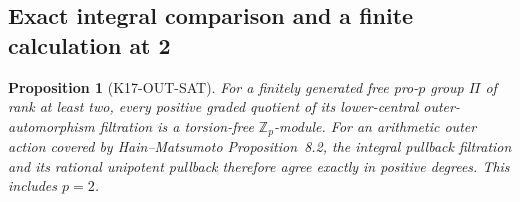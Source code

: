 \documentclass[11pt,a4paper]{article}
\newtheorem{proposition}[theorem]{Proposition}
\theoremstyle{definition}
\begin{document}
\subsection{Exact integral comparison and a finite calculation at 2}

\begin{proposition}[K17-OUT-SAT]\label{prop:outer-sat}
For a finitely generated free pro-$p$ group $\Pi$ of rank at least
two, every positive graded quotient of its lower-central
outer-automorphism filtration is a torsion-free $\mathbb Z_p$-module.
For an arithmetic outer action covered by Hain--Matsumoto
Proposition~8.2, the integral pullback filtration and its rational
unipotent pullback therefore agree exactly in positive degrees.
This includes $p=2$.
\end{proposition}
\end{document}
